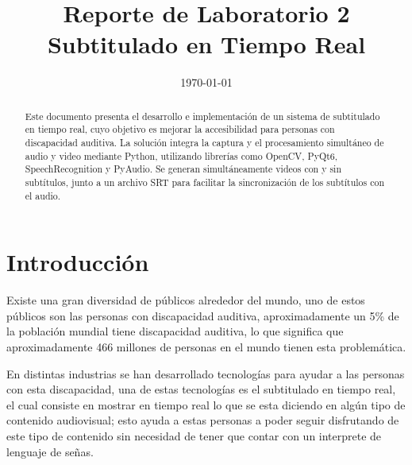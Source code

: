\documentclass[conference]{IEEEtran}
\date{\specialdate\today}
\begin{document}
\newcommand{\breite}{0.9} %
\newcommand{\RelacionFiguradoscolumnas}{0.9}
\newcommand{\RelacionFiguradoscolumnasPuntoCinco}{0.45}

\title{Reporte de Laboratorio 2 \\ Subtitulado en Tiempo Real}

\author{
}

\maketitle

\begin{abstract}
Este documento presenta el desarrollo e implementación de un sistema de subtitulado en tiempo real, cuyo objetivo es mejorar la accesibilidad para personas con discapacidad auditiva. La solución integra la captura y el procesamiento simultáneo de audio y video mediante Python, utilizando librerías como OpenCV\cite{OpenCV}, PyQt6\cite{PyQt6}, SpeechRecognition\cite{SpeechRecognition} y PyAudio. Se generan simultáneamente videos con y sin subtítulos, junto a un archivo SRT para facilitar la sincronización de los subtítulos con el audio.
\end{abstract}

\section{Introducción}
Existe una gran diversidad de públicos alrededor del mundo, uno de estos públicos son las personas con discapacidad auditiva, aproximadamente un 5\% de la población mundial tiene discapacidad auditiva, lo que significa que aproximadamente 466 millones de personas en el mundo tienen esta problemática. \cite{OMS}

En distintas industrias se han desarrollado tecnologías para ayudar a las personas con esta discapacidad, una de estas tecnologías es el subtitulado en tiempo real, el cual consiste en mostrar en tiempo real lo que se esta diciendo en algún tipo de contenido audiovisual; esto ayuda a estas personas a poder seguir disfrutando de este tipo de contenido sin necesidad de tener que contar con un interprete de lenguaje de señas.
\end{document}
